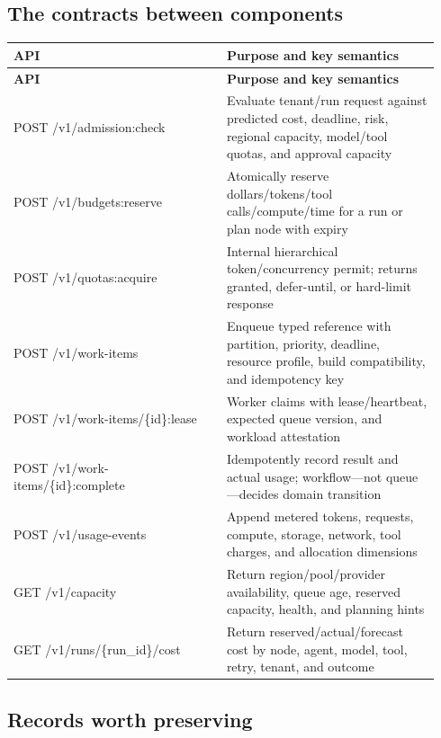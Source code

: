 \subsection{The contracts between components}

\BookTableStart
\small
\begin{longtable}{@{}Y{0.4700\linewidth}Y{0.4700\linewidth}@{}}
\color{white}\bfseries \textbf{API} & \color{white}\bfseries \textbf{Purpose and key semantics} \\
\endfirsthead
{}
\color{white}\bfseries \textbf{API} & \color{white}\bfseries \textbf{Purpose and key semantics} \\
\endhead
POST /v1/admission:check & Evaluate tenant/run request against predicted cost, deadline, risk, regional capacity, model/tool quotas, and approval capacity \\
POST /v1/budgets:reserve & Atomically reserve dollars/tokens/tool calls/compute/time for a run or plan node with expiry \\
POST /v1/quotas:acquire & Internal hierarchical token/concurrency permit; returns granted, defer-until, or hard-limit response \\
POST /v1/work-items & Enqueue typed reference with partition, priority, deadline, resource profile, build compatibility, and idempotency key \\
POST /v1/work-items/\{id\}:lease & Worker claims with lease/heartbeat, expected queue version, and workload attestation \\
POST /v1/work-items/\{id\}:complete & Idempotently record result and actual usage; workflow—not queue—decides domain transition \\
POST /v1/usage-events & Append metered tokens, requests, compute, storage, network, tool charges, and allocation dimensions \\
GET /v1/capacity & Return region/pool/provider availability, queue age, reserved capacity, health, and planning hints \\
GET /v1/runs/\{run\_id\}/cost & Return reserved/actual/forecast cost by node, agent, model, tool, retry, tenant, and outcome \\
\end{longtable}
\BookTableEnd

\subsection{Records worth preserving}

